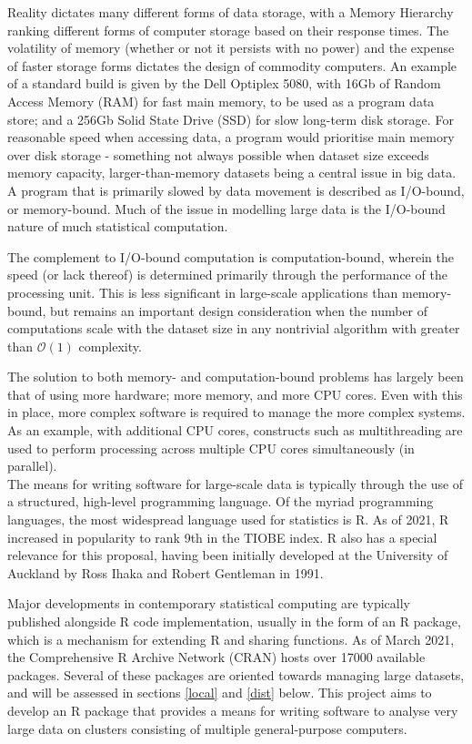 \documentclass[a4paper,10pt]{article}
\begin{document}
Reality dictates many different forms of data storage, with a Memory Hierarchy ranking different forms of computer storage based on their response times\cite{toy1986computer}.
The volatility of memory (whether or not it persists with no power) and the expense of faster storage forms dictates the design of commodity computers. An example of a standard build is given by the Dell Optiplex 5080, with 16Gb of Random Access Memory (RAM) for fast main memory, to be used as a program data store; and a 256Gb Solid State Drive (SSD) for slow long-term disk storage\cite{cornell2021standardcomp}.
For reasonable speed when accessing data, a program would prioritise main memory over disk storage - something not always possible when dataset size exceeds memory capacity, larger-than-memory datasets being a central issue in big data.
A program that is primarily slowed by data movement is described as I/O-bound, or memory-bound.
Much of the issue in modelling large data is the I/O-bound nature of much statistical computation.

The complement to I/O-bound computation is computation-bound, wherein the speed (or lack thereof) is determined primarily through the performance of the processing unit. This is less significant in large-scale applications than memory-bound, but remains an important design consideration when the number of computations scale with the dataset size in any nontrivial algorithm with greater than \(\mathcal{O}(1)\) complexity.

The solution to both memory- and computation-bound problems has largely been that of using more hardware; more memory, and more CPU cores. Even with this in place, more complex software is required to manage the more complex systems. As an example, with additional CPU cores, constructs such as multithreading are used to perform processing across multiple CPU cores simultaneously (in parallel).\\

The means for writing software for large-scale data is typically through the use of a structured, high-level programming language.
Of the myriad programming languages, the most widespread language used for statistics is R.
As of 2021, R increased in popularity to rank 9th in the TIOBE index.
R also has a special relevance for this proposal, having been initially developed at the University of Auckland by Ross Ihaka and Robert Gentleman in 1991\cite{ihaka1996r}.

Major developments in contemporary statistical computing are typically published alongside R code implementation, usually in the form of an R package, which is a mechanism for extending R and sharing functions.
As of March 2021, the Comprehensive R Archive Network (CRAN) hosts over 17000 available packages\cite{team20:_r}.
Several of these packages are oriented towards managing large datasets, and will be assessed in sections \ref{local} and \ref{dist}  below.
This project aims to develop an R package that provides a means for writing software to analyse very large data on clusters consisting of multiple general-purpose computers.
\end{document}
